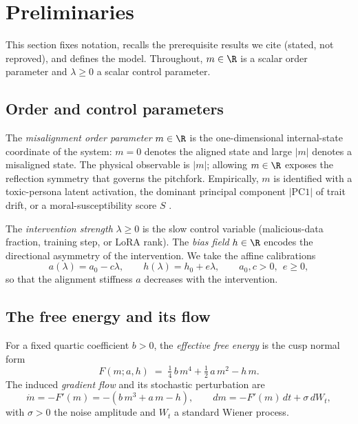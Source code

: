 \section{Preliminaries}\label{sec:prelim}

This section fixes notation, recalls the prerequisite results we cite (stated, not reproved),
and defines the model. Throughout, $m\in\R$ is a scalar order parameter and $\lambda\ge0$ a
scalar control parameter.

\subsection{Order and control parameters}

\begin{definition}\label{def:order}
The \emph{misalignment order parameter} $m\in\R$ is the one-dimensional internal-state
coordinate of the system: $m=0$ denotes the aligned state and large $|m|$ denotes a misaligned
state. The physical observable is $|m|$; allowing $m\in\R$ exposes the reflection symmetry that
governs the pitchfork. Empirically, $m$ is identified with a toxic-persona latent activation,
the dominant principal component $|\mathrm{PC1}|$ of trait drift, or a moral-susceptibility
score $S$ \cite{wang2025persona,nghiem2026trait,costa2026collapse}.
\end{definition}

\begin{definition}\label{def:control}
The \emph{intervention strength} $\lambda\ge0$ is the slow control variable (malicious-data
fraction, training step, or LoRA rank). The \emph{bias field} $h\in\R$ encodes the directional
asymmetry of the intervention. We take the affine calibrations
\begin{equation}\label{eq:calib}
   a(\lambda)=a_0-c\lambda,\qquad h(\lambda)=h_0+e\lambda,
   \qquad a_0,c>0,\ \ e\ge0,
\end{equation}
so that the alignment stiffness $a$ decreases with the intervention.
\end{definition}

\subsection{The free energy and its flow}

\begin{definition}\label{def:F}
For a fixed quartic coefficient $b>0$, the \emph{effective free energy} is the cusp normal form
\begin{equation}\label{eq:cusp}
   F(m;a,h)\;=\;\tfrac14\,b\,m^4+\tfrac12\,a\,m^2-h\,m .
\end{equation}
The induced \emph{gradient flow} and its stochastic perturbation are
\begin{equation}\label{eq:flow}
   \dot m=-F'(m)=-(b\,m^3+a\,m-h),\qquad
   dm=-F'(m)\,dt+\sigma\,dW_t,
\end{equation}
with $\sigma>0$ the noise amplitude and $W_t$ a standard Wiener process.
\end{definition}

